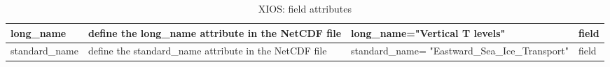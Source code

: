 \documentclass[../main/NEMO_manual]{subfiles}
\begin{document}
\begin{table}
\begin{tabularx}{\textwidth}{|l|X|l|l|}
    \hline
    long\_name                                                                                           &
    define the long\_name attribute in the NetCDF file                                                   &
    long\_name="Vertical T levels"                                                                       &
    field                                  \\
    \hline
    standard\_name                                                                                       &
    define the standard\_name attribute in the NetCDF file                                               &
    standard\_name= "Eastward\_Sea\_Ice\_Transport"                                                      &
    field                                  \\
    \hline
  \end{tabularx}
  \caption{XIOS: field attributes}
\end{table}
\end{document}
